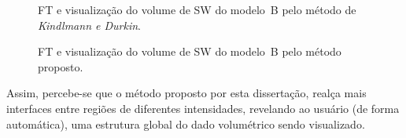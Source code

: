\begin{figure}[h]
	\centering
	\caption{FT e visualização do volume de SW do modelo~B pelo método de \textit{Kindlmann e Durkin}.}
	\label{fig:r_box_sw_kd}
\end{figure}

\begin{figure}[h]
	\centering
	\caption{FT e visualização do volume de SW do modelo~B pelo método proposto.}
	\label{fig:r_box_sw_mine}
\end{figure}

	Assim, percebe-se que o método proposto por esta dissertação, realça mais interfaces entre regiões de diferentes intensidades, revelando ao usuário (de forma automática), uma estrutura global do dado volumétrico sendo visualizado.

